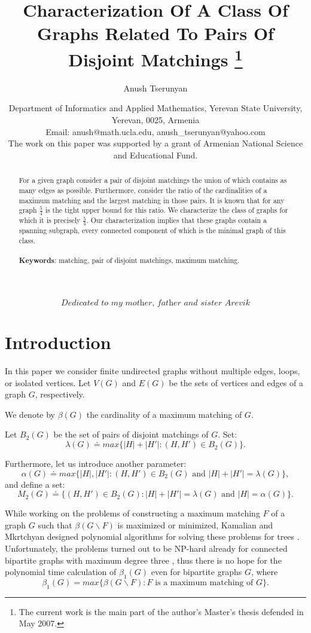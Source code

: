 \documentclass[a4paper, 12pt]{article}
\title{Characterization Of A Class Of Graphs Related To Pairs Of Disjoint Matchings \thanks{The current work is the main part of the author's Master's thesis defended in May 2007.}}
\author{Anush Tserunyan}
\date{\small{Department of Informatics and Applied Mathematics, Yerevan State
University, \\ Yerevan, 0025, Armenia \\ Email: anush@math.ucla.edu,
anush\_tserunyan@yahoo.com \\} \scriptsize{The work on this paper
was supported by a grant of Armenian National Science and
Educational Fund.}}
\newenvironment{dedication}[1][]{\begin{trivlist}
\item[\hskip \labelsep {\bfseries #1}]}{\end{trivlist}}
\begin{document}
\maketitle

\begin{dedication}
$$\textit{Dedicated to my mother, father and sister Arevik}$$
\end{dedication}

\begin{abstract}
For a given graph consider a pair of disjoint matchings the union of
which contains as many edges as possible. Furthermore, consider the
ratio of the cardinalities of a maximum matching and the largest
matching in those pairs. It is known that for any graph
$\frac{5}{4}$ is the tight upper bound for this ratio. We
characterize the class of graphs for which it is precisely
$\frac{5}{4}$. Our characterization implies that these graphs
contain a spanning subgraph, every connected component of which is
the minimal graph of this class.
\\ \\ {\bf Keywords}: matching, pair of disjoint matchings, maximum
matching.
\end{abstract}

\section{Introduction}
In this paper we consider finite undirected graphs without multiple
edges, loops, or isolated vertices. Let $V(G)$ and $E(G)$ be the
sets of vertices and edges of a graph $G$, respectively.

We denote by $\beta(G)$ the cardinality of a maximum matching of
$G$.

Let $B_2(G)$ be the set of pairs of disjoint matchings of $G$. Set:
$$\lambda(G) \doteq max \{ |H|+|H'| : (H,H') \in B_2(G)\}.$$

Furthermore, let us introduce another parameter:
$$\alpha(G) \doteq max \{ |H|,|H'| : (H,H') \in B_2(G) \text{ and } |H|+|H'|=\lambda(G) \},$$
and define a set:
$$M_2(G) \doteq \{(H,H') \in B_2(G) : |H|+|H'|=\lambda(G) \text{ and } |H| = \alpha(G) \}.$$

While working on the problems of constructing a maximum matching $F$
of a graph $G$ such that $\beta(G \backslash F)$ is maximized or
minimized, Kamalian and Mkrtchyan designed polynomial algorithms for
solving these problems for trees \cite{alg}. Unfortunately, the
problems turned out to be NP-hard already for connected bipartite
graphs with maximum degree three \cite{np}, thus there is no hope
for the polynomial time calculation of $\beta_1(G)$ even for
bipartite graphs $G$, where $$\beta_1(G) = max \{ \beta(G \backslash
F) : \text{$F$ is a maximum matching of $G$} \}.$$
\end{document}
